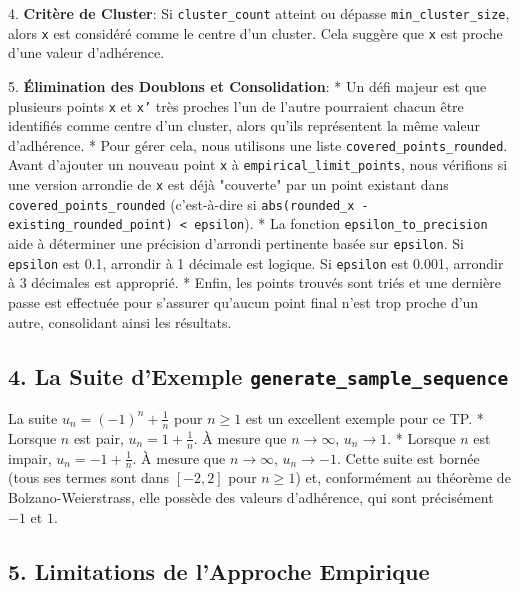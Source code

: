 \documentclass{report}
\begin{document}
4.  \textbf{Critère de Cluster}: Si \texttt{cluster\_count} atteint ou dépasse \texttt{min\_cluster\_size}, alors \texttt{x} est considéré comme le centre d'un cluster. Cela suggère que \texttt{x} est proche d'une valeur d'adhérence.

5.  \textbf{Élimination des Doublons et Consolidation}:
    *   Un défi majeur est que plusieurs points \texttt{x} et \texttt{x'} très proches l'un de l'autre pourraient chacun être identifiés comme centre d'un cluster, alors qu'ils représentent la même valeur d'adhérence.
    *   Pour gérer cela, nous utilisons une liste \texttt{covered\_points\_rounded}. Avant d'ajouter un nouveau point \texttt{x} à \texttt{empirical\_limit\_points}, nous vérifions si une version arrondie de \texttt{x} est déjà "couverte" par un point existant dans \texttt{covered\_points\_rounded} (c'est-à-dire si \texttt{abs(rounded\_x - existing\_rounded\_point) < epsilon}).
    *   La fonction \texttt{epsilon\_to\_precision} aide à déterminer une précision d'arrondi pertinente basée sur \texttt{epsilon}. Si \texttt{epsilon} est 0.1, arrondir à 1 décimale est logique. Si \texttt{epsilon} est 0.001, arrondir à 3 décimales est approprié.
    *   Enfin, les points trouvés sont triés et une dernière passe est effectuée pour s'assurer qu'aucun point final n'est trop proche d'un autre, consolidant ainsi les résultats.

\subsection*{4. La Suite d'Exemple \texttt{generate\_sample\_sequence}}

La suite $u_n = (-1)^n + \frac{1}{n}$ pour $n \ge 1$ est un excellent exemple pour ce TP.
*   Lorsque $n$ est pair, $u_n = 1 + \frac{1}{n}$. À mesure que $n \to \infty$, $u_n \to 1$.
*   Lorsque $n$ est impair, $u_n = -1 + \frac{1}{n}$. À mesure que $n \to \infty$, $u_n \to -1$.
Cette suite est bornée (tous ses termes sont dans $[-2, 2]$ pour $n \ge 1$) et, conformément au théorème de Bolzano-Weierstrass, elle possède des valeurs d'adhérence, qui sont précisément $-1$ et $1$.

\subsection*{5. Limitations de l'Approche Empirique}
\end{document}
